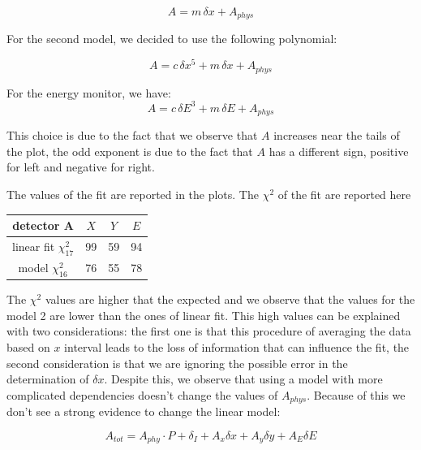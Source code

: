 \begin{equation}
A = m \, \delta x + A_{phys}
\end{equation}

For the second model, we decided to use the following polynomial:

\begin{equation}
A = c \, \delta x^{5} + m \, \delta x + A_{phys}
\end{equation}

For the energy monitor, we have:
\begin{equation}
A = c \, \delta E^{3} + m \, \delta E + A_{phys}
\end{equation}

This choice is due to the fact that we observe that $A$ increases near the tails of the plot, the odd exponent is due to the fact that $A$ has a different sign, positive for left and negative for right.

The values of the fit are reported in the plots. The $\chi^{2}$ of the fit are reported here

\begin{table}
\centering
\begin{tabular}{|c|c|c|c|}
\hline 
detector A & $X$ & $Y$ & $E$ \\ 
\hline 
linear fit $\chi^{2}_{17}$ & 99 & 59 & 94 \\ 
\hline 
model $\chi^{2}_{16}$ & 76 & 55 & 78 \\ 
\hline 
\end{tabular} 
\end{table}

The $\chi^{2}$ values are higher that the expected and we observe that the values for the model 2 are lower than the ones of linear fit.
This high values can be explained with two considerations: the first one is that this procedure of averaging the data based on $x$ interval leads to the loss of information that can influence the fit, the second consideration is that we are ignoring the possible error in the determination of $\delta x$.
Despite this, we observe that using a model with more complicated dependencies doesn't change  the values of $A_{phys}$. Because of this we don't see a strong evidence to change the linear model: 

\begin{equation}
A_{tot} = A_{phy} \cdot P + \delta_{I} + A_{x} \delta x + A_{y} \delta y + A_{E} \delta E 
\end{equation}


